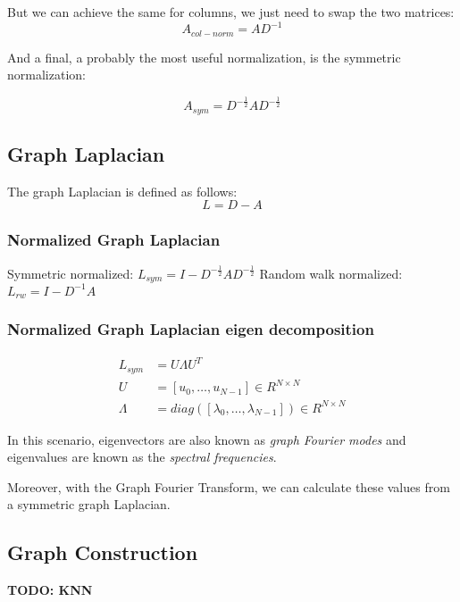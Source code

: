 But we can achieve the same for columns, we just need to swap the two matrices:
\begin{equation}
    A_{col-norm} = A D^{-1}
\end{equation}

And a final, a probably the most useful normalization, is the symmetric normalization:

\begin{equation}
    A_{sym} =  D^{-\frac{1}{2}} A D^{-\frac{1}{2}}
\end{equation}


\subsection{Graph Laplacian}
The graph Laplacian is defined as follows:
\begin{equation}
    L = D - A
\end{equation}


\subsubsection{Normalized Graph Laplacian}

Symmetric normalized: $L_{sym} = I - D^{-\frac{1}{2}} A D^{-\frac{1}{2}}$
Random walk normalized: $L_{rw} = I - D^{-1} A$

\subsubsection{Normalized Graph Laplacian eigen decomposition}

\begin{equation}
    \begin{aligned}
        L_{sym} &= U \Lambda U^T \\
        U &= [u_0, \dots, u_{N-1}] \in R^{N \times N}\\
        \Lambda &= diag \left ( [\lambda_0, \dots, \lambda_{N-1}]  \right ) \in R^{N \times N}
    \end{aligned}
\end{equation}

In this scenario, eigenvectors are also known as \textit{graph Fourier modes}
and eigenvalues are known as the \textit{spectral frequencies}.

Moreover, with the Graph Fourier Transform, we can calculate these values from a symmetric
graph Laplacian.

\subsection{Graph Construction}
\textbf{TODO: KNN}

